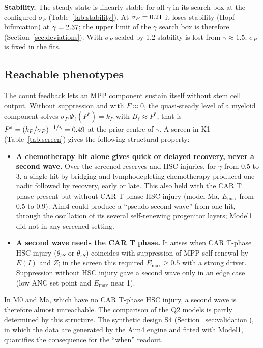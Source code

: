 \documentclass[11pt]{article}
\begin{document}
\textbf{Stability.} The steady state is linearly stable for all $\gamma$ in its search box at the configured $\sigma_P$ (Table~\ref{tab:stability}). At $\sigma_P=0.21$ it loses stability (Hopf bifurcation) at $\gamma=2.37$; the upper limit of the $\gamma$ search box is therefore \valGammaHi{} (Section~\ref{sec:deviations}). With $\sigma_P$ scaled by 1.2 stability is lost from $\gamma\approx1.5$; $\sigma_P$ is fixed in the fits.

\subsection{Reachable phenotypes}\label{sec:reachable}
The count feedback lets an MPP component sustain itself without stem cell output. Without suppression and with $F\approx0$, the quasi-steady level of a myeloid component solves $\sigma_P\,\Phi_\ell(P^\ast)=k_P$ with $B_\ell\approx P^\ast$, that is $P^\ast=(k_P/\sigma_P)^{-1/\gamma}=0.49$ at the prior centre of $\gamma$. A screen in K1 (Table~\ref{tab:screen}) gives the following structural property:
\begin{itemize}
\item \textbf{A chemotherapy hit alone gives quick or delayed recovery, never a second wave.} Over the screened reserves and HSC injuries, for $\gamma$ from 0.5 to 3, a single hit by bridging and lymphodepleting chemotherapy produced one nadir followed by recovery, early or late. This also held with the CAR T phase present but without CAR T-phase HSC injury (model Ma, $E_{\max}$ from 0.5 to 0.9). Aim4 could produce a ``pseudo second wave'' from one hit, through the oscillation of its several self-renewing progenitor layers; Model1 did not in any screened setting.
\item \textbf{A second wave needs the CAR T phase.} It arises when CAR T-phase HSC injury ($\theta_{bS}$ or $\theta_{zS}$) coincides with suppression of MPP self-renewal by $E(I)$ and $Z$; in the screen this required $E_{\max}\geq0.5$ with a strong driver. Suppression without HSC injury gave a second wave only in an edge case (low ANC set point and $E_{\max}$ near 1).
\end{itemize}
In M0 and Ma, which have no CAR T-phase HSC injury, a second wave is therefore almost unreachable. The comparison of the Q2 models is partly determined by this structure. The synthetic design S4 (Section~\ref{sec:validation}), in which the data are generated by the Aim4 engine and fitted with Model1, quantifies the consequence for the ``when'' readout.
\end{document}
